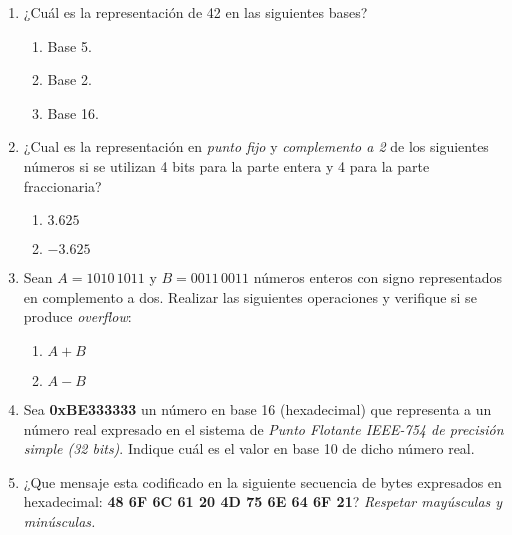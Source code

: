 \documentclass[12pt]{article}
\begin{document}
\begin{enumerate}

    \item ¿Cuál es la representación de 42 en las siguientes bases?

        \begin{enumerate}

            \item Base 5.

            \item Base 2.

            \item Base 16.

        \end{enumerate}

    \item ¿Cual es la representación en \emph{punto fijo} y \emph{complemento
        a 2} de los siguientes números si se utilizan 4 bits para la parte
        entera y 4 para la parte fraccionaria?

        \begin{enumerate}

            \item $3.625$

            \item $-3.625$

        \end{enumerate}

    \item Sean $A=1010\,1011$ y $B=0011\,0011$ números enteros con signo
        representados en complemento a dos. Realizar las siguientes
        operaciones y verifique si se produce \emph{overflow}:

        \begin{enumerate}

            \item $A+B$

            \item $A-B$

        \end{enumerate}

    \item Sea \textbf{0xBE333333} un número en base 16 (hexadecimal) que
        representa a un número real expresado en el sistema de \emph{Punto
        Flotante IEEE-754 de precisión simple (32 bits)}. Indique cuál es el
        valor en base 10 de dicho número real.

    \item ¿Que mensaje esta codificado en la siguiente secuencia de bytes
        expresados en hexadecimal: \textbf{48 6F 6C 61 20 4D 75 6E 64 6F 21}?
        \emph{Respetar mayúsculas y minúsculas.}


\end{enumerate}
\end{document}
